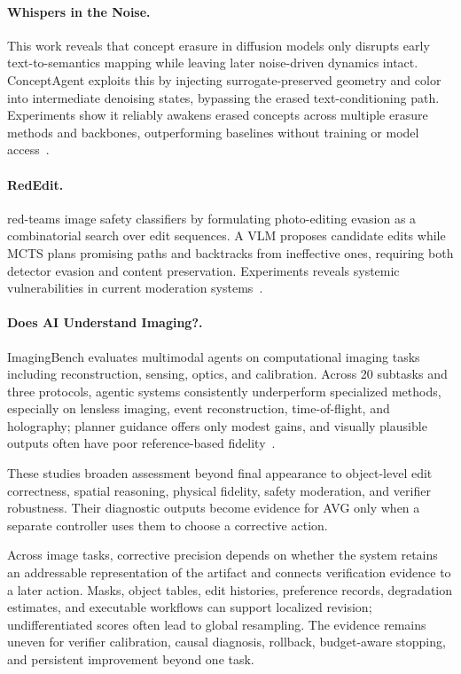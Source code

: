 \paragraph{Whispers in the Noise.}
This work reveals that concept erasure in diffusion models only disrupts early text-to-semantics mapping while leaving later noise-driven dynamics intact. ConceptAgent exploits this by injecting surrogate-preserved geometry and color into intermediate denoising states, bypassing the erased text-conditioning path. Experiments show it reliably awakens erased concepts across multiple erasure methods and backbones, outperforming baselines without training or model access~\cite{avg260518150}.


\paragraph{RedEdit.}
 red-teams image safety classifiers by formulating photo-editing evasion as a combinatorial search over edit sequences. A VLM proposes candidate edits while MCTS plans promising paths and backtracks from ineffective ones, requiring both detector evasion and content preservation. Experiments reveals systemic vulnerabilities in current moderation systems~\cite{avg260606140}.

\paragraph{Does AI Understand Imaging?.}
ImagingBench evaluates multimodal agents on computational imaging tasks including reconstruction, sensing, optics, and calibration. Across 20 subtasks and three protocols, agentic systems consistently underperform specialized methods, especially on lensless imaging, event reconstruction, time-of-flight, and holography; planner guidance offers only modest gains, and visually plausible outputs often have poor reference-based fidelity~\cite{avg260707189}.

These studies broaden assessment beyond final appearance to object-level edit correctness, spatial reasoning, physical fidelity, safety moderation, and verifier robustness. Their diagnostic outputs become evidence for AVG only when a separate controller uses them to choose a corrective action.

Across image tasks, corrective precision depends on whether the system retains an addressable representation of the artifact and connects verification evidence to a later action. Masks, object tables, edit histories, preference records, degradation estimates, and executable workflows can support localized revision; undifferentiated scores often lead to global resampling. The evidence remains uneven for verifier calibration, causal diagnosis, rollback, budget-aware stopping, and persistent improvement beyond one task.

\FloatBarrier
